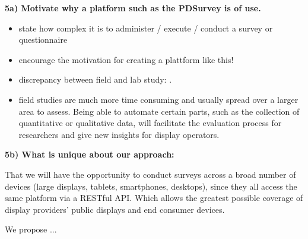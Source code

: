 

	\textbf{5a) Motivate why a platform such as the PDSurvey is of use. }

		\begin{itemize}[itemsep=0pt] 
		\item state how complex it is to administer / execute / conduct a survey or questionnaire
		\item encourage the motivation for creating a plattform like this!
		\item discrepancy between field and lab study: \cite{Ojala2011}.
		\item field studies are much more time consuming and usually spread over a larger area to assess. Being able to automate certain parts, such as the collection of quantitative or qualitative data, will facilitate the evaluation process for researchers and give new insights for display operators.
		\end{itemize}

	\textbf{5b) What is unique about our approach:}

		That we will have the opportunity to conduct surveys across a broad number of devices (large displays, tablets, smartphones, desktops), since they all access the same platform via a RESTful API. Which allows the greatest possible coverage of display providers' public displays and end consumer devices.

		We propose ...










